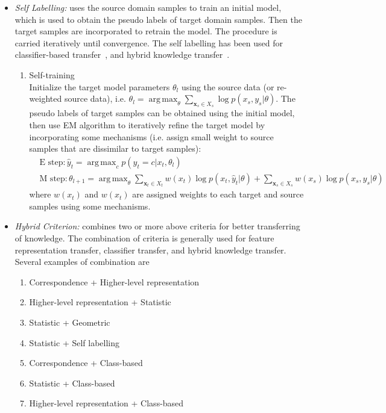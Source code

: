 \documentclass[prodmode]{acmsmall}  %
\DeclareMathOperator*{\argmax}{arg\,max}
\begin{document}
\begin{itemize}
\begin{enumerate}
\end{enumerate}
\item \textit{Self Labelling:} uses the source domain samples to train an initial model, which is used to obtain the pseudo labels of target domain samples. Then the target samples are incorporated to retrain the model. The procedure is carried iteratively until convergence. The self labelling has been used for classifier-based transfer~\cite{Dai2007a,Tan2009}, and hybrid knowledge transfer~\cite{Dai2007,Chen2011}.
\begin{enumerate}
\item Self-training~\cite{Dai2007,Tan2009}\\
Initialize the target model parameters $\theta_l$ using the source data (or re-weighted source data), i.e. $\theta_l = \argmax_\theta \sum_{\mathbf{x}_s\in{X_s}} \log p(x_s,y_s|\theta)$. The pseudo labels of target samples can be obtained using the initial model, 
then use EM algorithm to iteratively refine the target model by incorporating some mechanisms 
(i.e. assign small weight to source samples that are dissimilar to target samples):
\begin{align}
& \text{E step}: \hat{y}_t = \argmax_{c} p(y_t=c|x_t,\theta_l)\\
& \text{M step}: \theta_{l+1} = \argmax_{\theta} \sum_{\mathbf{x}_t\in{X_t}}  w(x_t) \log p(x_t,\hat{y}_t|\theta) + \sum_{\mathbf{x}_s\in{X_s}} w(x_s) \log p(x_s,y_s|\theta)
\end{align}
where $w(x_t)$ and $w(x_t)$ are assigned weights to each target and source samples using some mechanisms.
\end{enumerate}
\item \textit{Hybrid Criterion:} combines two or more above criteria for better transferring of knowledge. The combination of criteria is generally used for feature representation transfer, classifier transfer, and hybrid knowledge transfer. Several examples of combination are
\begin{enumerate}
\item Correspondence + Higher-level representation~\cite{Huang2013}
\item Higher-level representation + Statistic~\cite{Long2013a,Long2015a,Wei2016}
\item Statistic + Geometric~\cite{Zhang2017}
\item Statistic + Self labelling~\cite{Dai2007a}
\item Correspondence + Class-based~\cite{Diethe2008}
\item Statistic + Class-based~\cite{Duan2012}
\item Higher-level representation + Class-based~\cite{Zhu2014b}
\end{enumerate}
\end{itemize}
\end{document}
